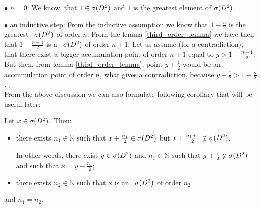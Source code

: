 $\bullet$ $n=0$: We know, that $1\in {{\sigma}(D^2)}$ and $1$ is the greatest element of ${{\sigma}(D^2)}$. 

$\bullet$ an inductive step: From the inductive assumption we know that $1-\frac{n}{2}$ is 
the greatest \apots\ ${{\sigma}(D^2)}$ of order $n$. From the lemma \ref{third_order_lemma} we have then 
that $1-\frac{n+1}{2}$ is a \apots\ ${{\sigma}(D^2)}$ of order $n+1$. Let us assume (for a contradiction), 
that there exist a bigger accumulation point of order $n+1$ equal to $y > 1-\frac{n+1}{2}$. 
But then, from lemma \ref{third_order_lemma}, point $y+\frac{1}{2}$ would be an acccumulation 
point 
of order $n$, what gives a contradiction, because $y+\frac{1}{2}>1-\frac{n}{2}$. $_\square$ 
\\[8pt]
From the above discussion we can also formulate following corollary that will be useful later: 
\begin{corollary}\label{predescors}
Let $x \in {{\sigma}(D^2)}$. Then:
\begin{itemize}
\item there exists $n_1 \in \mathbb{N}$ such that $x + \frac{n_1}{2} \in {{\sigma}(D^2)}$ 
but $x+\frac{n_1+1}{2} \not\in {{\sigma}(D^2)}$. 

In other words, there exist $y \in {{\sigma}(D^2)}$ and 
$n_1 \in \mathbb{N}$ such that 
$y + \frac{1}{2} \not\in {{\sigma}(D^2)}$ and such that $x = y - \frac{n_1}{2}$;
\item there exists $n_2 \in \mathbb{N}$ such that $x$ is an \apots\ ${{\sigma}(D^2)}$ of 
order $n_2$
\end{itemize}
and $n_1 = n_2$.
\end{corollary}

